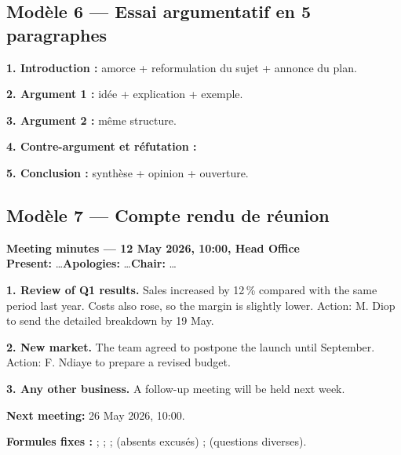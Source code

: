 \subsection{Modèle 6 --- Essai argumentatif en 5 paragraphes}
\begin{dialoguebox}
\begin{anglais}
\textbf{1. Introduction :} amorce + reformulation du sujet + annonce du plan.\\

\textbf{2. Argument 1 :} idée + explication + exemple.\\

\textbf{3. Argument 2 :} même structure.\\

\textbf{4. Contre-argument et réfutation :}\\

\textbf{5. Conclusion :} synthèse + opinion + ouverture.\\
\end{anglais}
\end{dialoguebox}

\subsection{Modèle 7 --- Compte rendu de réunion}
\begin{dialoguebox}[Structure]
\begin{anglais}
\textbf{Meeting minutes --- 12 May 2026, 10:00, Head Office}\\
\textbf{Present:} \ldots \quad \textbf{Apologies:} \ldots \quad \textbf{Chair:} \ldots

\textbf{1. Review of Q1 results.} Sales increased by 12\,\% compared with the same period
last year. Costs also rose, so the margin is slightly lower. Action: M. Diop to send the
detailed breakdown by 19 May.

\textbf{2. New market.} The team agreed to postpone the launch until September. Action:
F. Ndiaye to prepare a revised budget.

\textbf{3. Any other business.} A follow-up meeting will be held next week.

\textbf{Next meeting:} 26 May 2026, 10:00.
\end{anglais}
\end{dialoguebox}
\textbf{Formules fixes :}  ;
 ;  ;
 (absents excusés) ;  (questions diverses).

